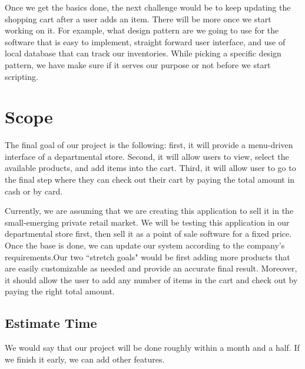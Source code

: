 \documentclass[10pt,conference,onecolumn,compsoc]{IEEEtran}
\begin{document}
Once we get the basics done, the next challenge would be to keep updating the shopping cart after a user adds an item. There will be more once we start working on it. For example, what design pattern are we going to use for the software that is easy to implement, straight forward user interface, and use of local database that can track our inventories. While picking a specific design pattern, we have make sure if it serves our purpose or not before we start scripting.



\section{Scope}
The final goal of our project is the following: first, it will provide a menu-driven interface of a departmental store. Second, it will allow users to view, select the available products, and add items into the cart. Third, it will allow user to go to the final step where they can check out their cart by paying the total amount in cash or by card. \newline

Currently, we are assuming that we are creating this application to sell it in the small-emerging private retail market. We will be testing this application in our departmental store first, then sell it as a point of sale software for a fixed price. Once the base is done, we can update our system according to the company's requirements.Our two ``stretch goals" would be first adding more products that are easily customizable as needed and provide an accurate final result. Moreover, it should allow the user to add any number of items in the cart and check out by paying the right total amount.\\
\subsection{Estimate Time}
We would say that our project will be done roughly within a month and a half. If we finish it early, we can add other features.
\end{document}
